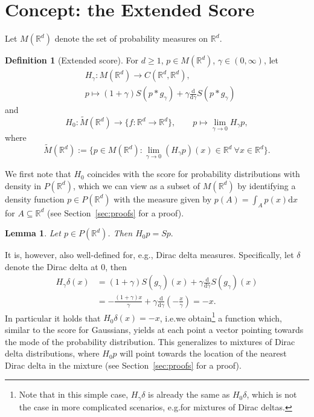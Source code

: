 \documentclass{article}
\newcommand{\R}{\mathbb{R}}
\theoremstyle{plain}
\newtheorem{lemma}[theorem]{Lemma}
\theoremstyle{definition}
\newtheorem{definition}[theorem]{Definition}
\theoremstyle{remark}
\renewcommand{\d}{\mathrm{d}}
\newcommand{\ddgamma}{\tfrac{\d}{\d\gamma}}
\begin{document}
\section{Concept: the Extended Score}\label{sec:concept}
Let $M(\R^d)$ denote the set of probability measures on $\R^d$.
\begin{definition}[Extended score]\label{def:exScore}
For $d \geq 1$, $p\in M(\R^d)$, $\gamma\in(0,\infty)$, let
\begin{align*}
     &H_\gamma\colon M(\R^d)\to C(\R^d,\R^d),\\    
     & p\mapsto (1+\gamma)S(p*g_\gamma) +\gamma\ddgamma S(p*g_\gamma)
     \end{align*}
     and
     \[
    H_0\colon \widetilde{M}(\R^d)\to \{f\colon \R^d\to\R^d\},\qquad 
    p\mapsto\lim_{\gamma\to 0} H_\gamma p,
    \]
where $$\widetilde{M}(\R^d):=\{p\in M(\R^d)\colon \lim_{\gamma\to 0} (H_\gamma p)(x)\in\R^d\ \forall x\in\R^d\}.$$
\end{definition}
We first note that $H_0$ coincides with the score for probability distributions with density in $P(\R^d)$, which we can view as a subset of $M(\R^d)$ by identifying a density function $p\in P(\R^d)$ with the measure given by $p(A)=\int_A p(x)\d x$ for $A\subseteq\R^d$ (see Section~\ref{sec:proofs} for a proof).
\begin{lemma}\label{lem:extension}
    Let $p\in P(\R^d)$. Then
    \(
        H_0p=Sp.
    \)
\end{lemma}
It is, however, also well-defined for, e.g., Dirac delta measures. Specifically, let $\delta$ denote the Dirac delta at $0$, then
\begin{align*}
    H_\gamma \delta(x)&=(1+\gamma)S(g_\gamma)(x)+\gamma\ddgamma S(g_\gamma)(x)\\&= -\tfrac{(1+\gamma)x}{\gamma} +\gamma\ddgamma(-\tfrac{x}{\gamma})=-x.
\end{align*}
In particular it holds that $H_0\delta(x)=-x$, i.e.\@ we obtain\footnote{Note that in this simple case, $H_\gamma\delta$ is already the same as $H_0\delta$, which is not the case in more complicated scenarios, e.g.\@ for mixtures of Dirac deltas.} a function which, similar to the score for Gaussians, yields at each point a vector pointing towards the mode of the probability distribution. This generalizes to mixtures of Dirac delta distributions, where $H_0p$ will point towards the location of the nearest Dirac delta in the mixture (see Section~\ref{sec:proofs} for a proof).\\
\end{document}

